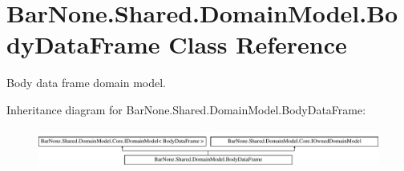 \hypertarget{class_bar_none_1_1_shared_1_1_domain_model_1_1_body_data_frame}{}\section{Bar\+None.\+Shared.\+Domain\+Model.\+Body\+Data\+Frame Class Reference}
\label{class_bar_none_1_1_shared_1_1_domain_model_1_1_body_data_frame}


Body data frame domain model.  


Inheritance diagram for Bar\+None.\+Shared.\+Domain\+Model.\+Body\+Data\+Frame\+:\begin{figure}[H]
\begin{center}
\leavevmode
\includegraphics[height=1.311475cm]{class_bar_none_1_1_shared_1_1_domain_model_1_1_body_data_frame}
\end{center}
\end{figure}
